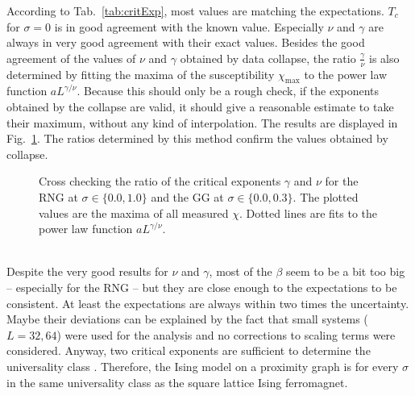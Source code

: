     According to Tab.\ \ref{tab:critExp}, most values
    are matching the expectations.
    \(T_c\) for \(\sigma = 0\) is in good
    agreement with the known value. Especially \(\nu\) and \(\gamma\)
    are always in very good agreement with their exact values. Besides the
    good agreement of the values of \(\nu\) and \(\gamma\) obtained by data collapse,
    the ratio \(\frac{\gamma}{\nu}\) is also determined by fitting the maxima of
    the susceptibility \(\chi_{\mathrm{max}}\) to the power law function \(aL^{\gamma/\nu}\).
    Because this should only be a rough check, if the exponents obtained
    by the collapse are valid, it should give a
    reasonable estimate to take their maximum, without any kind of interpolation.
    The results are displayed in Fig.\ \ref{fig:susCrossCheck}. The ratios
    determined by this method confirm the values obtained by collapse.
    \begin{figure}[htbp]
        \centering
        \caption[Alternative Way Determining $\gamma / \nu$]
        {
            Cross checking the ratio of the critical exponents $\gamma$ and $\nu$ for
                 the RNG at $\sigma \in \{0.0, 1.0\}$ and
                 the GG at $\sigma \in \{0.0, 0.3\}$.
            The plotted values are the maxima of all measured \(\chi\).
            Dotted lines are fits to the power law function \(aL^{\gamma/\nu}\).
        }
        \label{fig:susCrossCheck}
    \end{figure}\\
    Despite the very good results for \(\nu\) and \(\gamma\), most of the
    \(\beta\) seem to be a bit too big -- especially for the RNG -- but
    they are close enough to the expectations to be consistent. At least
    the expectations are always within two times the uncertainty.
    Maybe their deviations can be explained by the fact that small
    systems (\(L=32,64\)) were used for the analysis and no corrections
    to scaling terms were considered.
    Anyway, two critical exponents are sufficient to determine the
    universality class \cite[p. 145]{Katzgraber2011}. Therefore,
    the Ising model on a proximity graph is for every \(\sigma\) in the
    same universality class as the square lattice Ising ferromagnet.

